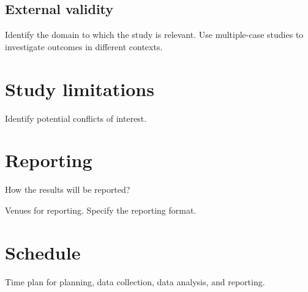 \subsection{External validity}
\label{subsec:external}
Identify the domain to which the study is relevant. Use multiple-case studies to investigate outcomes in different contexts. 

\section{Study limitations}
\label{sec:limitations}
Identify potential conflicts of interest. 

\section{Reporting}
\label{sec:reporting}
How the results will be reported? 

Venues for reporting. Specify the reporting format.

\section{Schedule}
\label{sec:schedule}
Time plan for planning, data collection, data analysis, and reporting.



